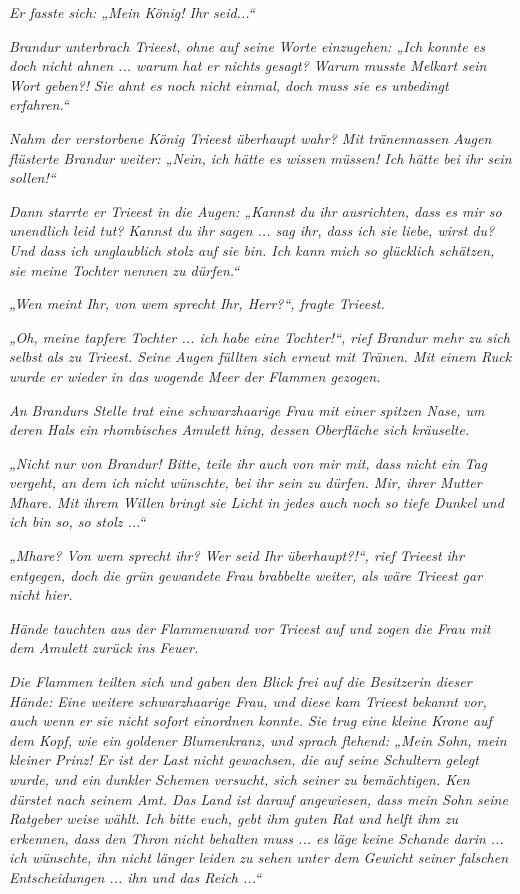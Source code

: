 \textit{Er fasste sich: „Mein König! Ihr seid...“}

\textit{Brandur unterbrach Trieest, ohne auf seine Worte einzugehen: „Ich konnte es doch nicht ahnen ... warum hat er nichts gesagt? Warum musste Melkart sein Wort geben?! Sie ahnt es noch nicht einmal, doch muss sie es unbedingt erfahren.“}

\textit{Nahm der verstorbene König Trieest überhaupt wahr? Mit tränennassen Augen flüsterte Brandur weiter: „Nein, ich hätte es wissen müssen! Ich hätte bei ihr sein sollen!“}

\textit{Dann starrte er Trieest in die Augen: „Kannst du ihr ausrichten, dass es mir so unendlich leid tut? Kannst du ihr sagen ... sag ihr, dass ich sie liebe, wirst du? Und dass ich unglaublich stolz auf sie bin. Ich kann mich so glücklich schätzen, sie meine Tochter nennen zu dürfen.“}

\textit{„Wen meint Ihr, von wem sprecht Ihr, Herr?“, fragte Trieest.}

\textit{„Oh, meine tapfere Tochter ... ich habe eine Tochter!“, rief Brandur mehr zu sich selbst als zu Trieest. Seine Augen füllten sich erneut mit Tränen. Mit einem Ruck wurde er wieder in das wogende Meer der Flammen gezogen.}\bigskip



\textit{An Brandurs Stelle trat eine schwarzhaarige Frau mit einer spitzen Nase, um deren Hals ein rhombisches Amulett hing, dessen Oberfläche sich kräuselte.}

\textit{„Nicht nur von Brandur! Bitte, teile ihr auch von mir mit, dass nicht ein Tag vergeht, an dem ich nicht wünschte, bei ihr sein zu dürfen. Mir, ihrer Mutter Mhare. Mit ihrem Willen bringt sie Licht in jedes auch noch so tiefe Dunkel und ich bin so, so stolz ...“}

\textit{„Mhare? Von wem sprecht ihr? Wer seid Ihr überhaupt?!“, rief Trieest ihr entgegen, doch die grün gewandete Frau brabbelte weiter, als wäre Trieest gar nicht hier.}

\textit{Hände tauchten aus der Flammenwand vor Trieest auf und zogen die Frau mit dem Amulett zurück ins Feuer.}\bigskip



\textit{Die Flammen teilten sich und gaben den Blick frei auf die Besitzerin dieser Hände: Eine weitere schwarzhaarige Frau, und diese kam Trieest bekannt vor, auch wenn er sie nicht sofort einordnen konnte. Sie trug eine kleine Krone auf dem Kopf, wie ein goldener Blumenkranz, und sprach flehend: „Mein Sohn, mein kleiner Prinz! Er ist der Last nicht gewachsen, die auf seine Schultern gelegt wurde, und ein dunkler Schemen versucht, sich seiner zu bemächtigen. Ken dürstet nach seinem Amt. Das Land ist darauf angewiesen, dass mein Sohn seine Ratgeber weise wählt. Ich bitte euch, gebt ihm guten Rat und helft ihm zu erkennen, dass den Thron nicht behalten muss ... es läge keine Schande darin ... ich wünschte, ihn nicht länger leiden zu sehen unter dem Gewicht seiner falschen Entscheidungen ... ihn und das Reich ...“}

